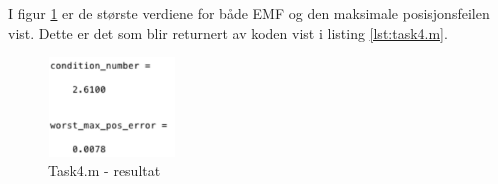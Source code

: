 I figur \ref{fig:task4answer} er de største verdiene for både EMF og den maksimale posisjonsfeilen vist. Dette er det som blir returnert av koden vist i listing \ref{lst:task4.m}. 

\begin{figure}[h]
	\centering
	\includegraphics[width=0.3\textwidth]{sections/Exercise4/task4answer.png}
	\caption{Task4.m - resultat}
	\label{fig:task4answer}
\end{figure}